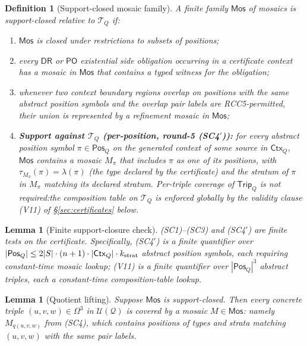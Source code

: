 \documentclass[11pt]{article}
\newtheorem{lemma}[theorem]{Lemma}
\newtheorem{definition}[theorem]{Definition}
\newcommand{\DR}{\mathsf{DR}}
\newcommand{\PO}{\mathsf{PO}}
\newcommand{\Q}{\mathcal Q}
\newcommand{\U}{\mathcal U}
\newcommand{\Mos}{\mathsf{Mos}}
\newcommand{\Ctx}{\mathsf{Ctx}}
\newcommand{\Pos}{\mathsf{Pos}}
\newcommand{\Trip}{\mathsf{Trip}}
\newcommand{\T}{\mathcal T}
\begin{document}
\begin{definition}[Support-closed mosaic family]\label{def:support-closed}
A finite family $\Mos$ of mosaics is \emph{support-closed} relative
to $\mathcal T_Q$ if:
\begin{enumerate}[label=(SC\arabic*)]
\item $\Mos$ is closed under restrictions to subsets of positions;
\item every $\DR$ or $\PO$ existential side obligation occurring in
a certificate context has a mosaic in $\Mos$ that contains a typed
witness for the obligation;
\item whenever two context boundary regions overlap on positions
with the same abstract position symbols and the overlap pair labels
are RCC5-permitted, their union is represented by a refinement
mosaic in $\Mos$;
\item \textbf{Support against $\T_Q$ (per-position, round-5 (SC4$'$)):}
for every abstract position symbol $\pi\in\Pos_Q$ on the generated
context of some source in $\Ctx_Q$, $\Mos$ contains a mosaic
$M_\pi$ that includes $\pi$ as one of its positions, with
$\tau_{M_\pi}(\pi)=\lambda(\pi)$ (the type declared by the
certificate) and the stratum of $\pi$ in $M_\pi$ matching its
declared stratum.  Per-triple coverage of $\Trip_Q$ is not
required:\@ the composition table on $\T_Q$ is enforced globally by
the validity clause (V11) of \S\ref{sec:certificates} below.
\end{enumerate}
\end{definition}

\begin{lemma}[Finite support-closure check]\label{lem:sc-finite}
(SC1)--(SC3) and (SC4$'$) are finite tests on the certificate.
Specifically, (SC4$'$) is a finite quantifier over $|\Pos_Q|\le
2|S|\cdot(n+1)\cdot|\Ctx_Q|\cdot k_{\rm strat}$ abstract position
symbols, each requiring constant-time mosaic lookup; (V11) is a
finite quantifier over $|\Pos_Q|^3$ abstract triples, each a
constant-time composition-table lookup.
\end{lemma}

\begin{lemma}[Quotient lifting]\label{lem:quotient-lift}
Suppose $\Mos$ is support-closed.  Then every concrete triple
$(u,v,w)\in\Omega^3$ in $\U(\Q)$ is covered by a mosaic $M\in\Mos$:
namely $M_{q(u,v,w)}$ from (SC4), which contains positions of
types and strata matching $(u,v,w)$ with the same pair labels.
\end{lemma}
\end{document}
